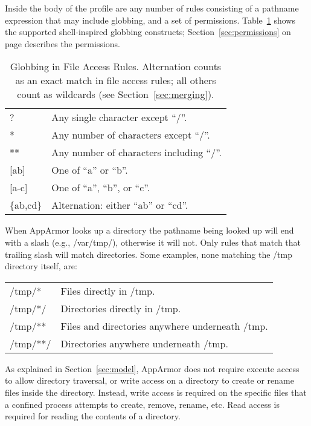 \documentclass[a4paper]{article}
\begin{document}
Inside the body of the profile are any number of rules consisting of a
pathname expression that may include globbing, and a set of permissions.
Table~\ref{tab:globbing} shows the supported shell-inspired globbing
constructs; Section~\ref{sec:permissions} on page
\pageref{sec:permissions} describes the permissions.

\begin{table}[tb]
\center
\begin{tabular}{|l|l|}
\hline
{?}		&	Any single character except ``/''.		\\
{*}		&	Any number of characters except ``/''.		\\
{**}		&	Any number of characters including ``/''.	\\
{[ab]}		&	One of ``a'' or ``b''.				\\
{[a-c]}		&	One of ``a'', ``b'', or ``c''.			\\
\{ab,cd\}	&	Alternation: either ``ab'' or ``cd''.		\\
\hline
\end{tabular}
\caption{Globbing in File Access Rules. Alternation counts as an exact
match in file access rules; all others count as wildcards (see
Section~\ref{sec:merging}).}
\label{tab:globbing}
\end{table}

When AppArmor looks up a directory the pathname being looked up will end
with a slash (e.g., /var/tmp/), otherwise it will not.  Only rules
that match that trailing slash will match directories.  Some examples,
none matching the /tmp directory itself, are:

\begin{tabbing}
\begin{tabular}{ll}
{/tmp/*}	& Files directly in /tmp.				\\
{/tmp/*/}	& Directories directly in /tmp.				\\
{/tmp/**}	& Files and directories anywhere underneath /tmp.	\\
{/tmp/**/}	& Directories anywhere underneath /tmp.			\\
\end{tabular}
\end{tabbing}

As explained in Section~\ref{sec:model}, AppArmor does not require
execute access to allow directory traversal, or write access on a
directory to create or rename files inside the directory. Instead, write
access is required on the specific files that a confined process
attempts to create, remove, rename, etc.  Read access is required for
reading the contents of a directory.
\end{document}
